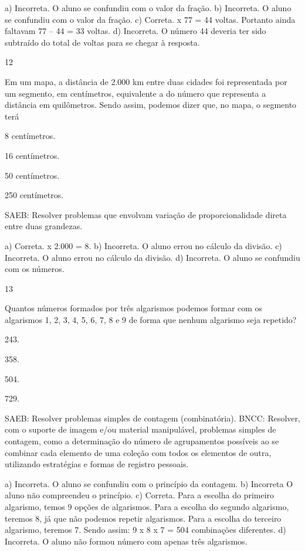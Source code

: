 \begin{mdframed}[linewidth=2pt,linecolor=salmao,roundcorner=2pt]
\begin{escolha}
{\begin{escolha}
\begin{escolha}
a) Incorreta. O aluno se confundiu com o valor da fração.
b) Incorreta. O aluno se confundiu com o valor da fração.
c) Correta.  x 77 = 44 voltas. Portanto ainda faltavam 77 -- 44 = 33 voltas.
d) Incorreta. O número 44 deveria ter sido subtraído do total de voltas para se chegar à resposta.

\num{12}

Em um mapa, a distância de 2.000 km entre duas cidades foi representada
por um segmento, em centímetros, equivalente a  do número que
representa a distância em quilômetros. Sendo assim, podemos dizer que, no
mapa, o segmento terá

\begin{escolha}
\item
  8 centímetros.
\item
  16 centímetros.
\item
  50 centímetros.
\item
  250 centímetros.
\end{escolha}

SAEB: Resolver problemas que envolvam variação de
proporcionalidade direta entre duas grandezas.

a) Correta.  x 2.000 = 8.
b) Incorreta. O aluno errou no cálculo da divisão.
c) Incorreta. O aluno errou no cálculo da divisão.
d) Incorreta. O aluno se confundiu com os números.

\num{13}

Quantos números formados por três algarismos podemos formar com os
algarismos 1, 2, 3, 4, 5, 6, 7, 8 e 9 de forma que nenhum algarismo seja
repetido?

\begin{escolha}
\item
  243.
\item
  358.
\item
  504.
\item
  729.
\end{escolha}

SAEB: Resolver problemas simples de contagem (combinatória).
BNCC: Resolver, com o suporte de imagem e/ou material manipulável, problemas simples
de contagem, como a determinação do número de agrupamentos possíveis ao se combinar cada
elemento de uma coleção com todos os elementos de outra, utilizando estratégias e formas de
registro pessoais.

a) Incorreta. O aluno se confundiu com o princípio da contagem.
b) Incorreta O aluno não compreendeu o princípio.
c) Correta. Para a escolha do primeiro algarismo, temos 9 opções de algarismos. Para
a escolha do segundo algarismo, teremos 8, já que não podemos repetir
algarismos. Para a escolha do terceiro algarismo, teremos 7. Sendo assim: 9 x 8 x 7 = 504 combinações diferentes.
d) Incorreta. O aluno não formou número com apenas três algarismos.


\end{escolha}
\end{escolha}}
\end{escolha}
\end{mdframed}
